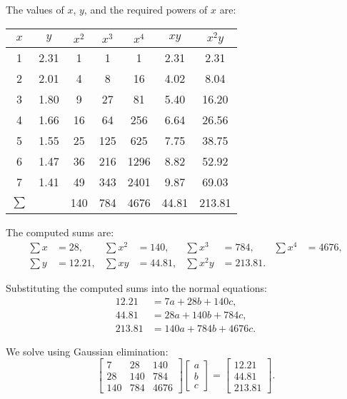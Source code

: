 \documentclass[12pt]{article}
\begin{document}
\begin{enumerate}[leftmargin=0em]
  The values of $x$, $y$, and the required powers of $x$ are:
  \begin{center}
  \begin{tabular}{c|c|c|c|c|c|c}
  $x$ & $y$ & $x^2$ & $x^3$ & $x^4$ & $xy$ & $x^2y$ \\
  \hline
  1 & 2.31 & 1 & 1 & 1 & 2.31 & 2.31 \\
  2 & 2.01 & 4 & 8 & 16 & 4.02 & 8.04 \\
  3 & 1.80 & 9 & 27 & 81 & 5.40 & 16.20 \\
  4 & 1.66 & 16 & 64 & 256 & 6.64 & 26.56 \\
  5 & 1.55 & 25 & 125 & 625 & 7.75 & 38.75 \\
  6 & 1.47 & 36 & 216 & 1296 & 8.82 & 52.92 \\
  7 & 1.41 & 49 & 343 & 2401 & 9.87 & 69.03 \\
  \hline
  $\sum$ &  & 140 & 784 & 4676 & 44.81 & 213.81 \\
  \end{tabular}
  \end{center}

  The computed sums are:
  \begin{align}
  \sum x &= 28, & \sum x^2 &= 140, & \sum x^3 &= 784, & \sum x^4 &= 4676, \\
  \sum y &= 12.21, & \sum xy &= 44.81, & \sum x^2y &= 213.81.
  \end{align}

  Substituting the computed sums into the normal equations:
  \begin{align}
  12.21 &= 7a + 28b + 140c, \\
  44.81 &= 28a + 140b + 784c, \\
  213.81 &= 140a + 784b + 4676c.
  \end{align}

  We solve using Gaussian elimination:
  \begin{equation}
  \begin{bmatrix}
  7 & 28 & 140 \\
  28 & 140 & 784 \\
  140 & 784 & 4676
  \end{bmatrix}
  \begin{bmatrix} a \\ b \\ c \end{bmatrix} = 
  \begin{bmatrix} 12.21 \\ 44.81 \\ 213.81 \end{bmatrix}.
  \end{equation}


\end{enumerate}
\end{document}
